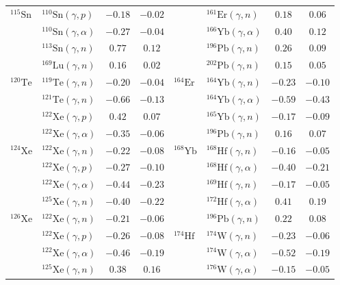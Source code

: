 \begin{table}
\begin{tabular}{llcc|llcc}
    $^{115}\mathrm{Sn}$ & $^{110}\mathrm{Sn}(\gamma,p)$ & $-0.18$ & $-0.02$ & $ $ & $^{161}\mathrm{Er}(\gamma,n)$ & $0.18$ & $0.06$ \\ 
    $ $ & $^{110}\mathrm{Sn}(\gamma,\alpha)$ & $-0.27$ & $-0.04$ & $ $ & $^{166}\mathrm{Yb}(\gamma,\alpha)$ & $0.40$ & $0.12$ \\ 
    $ $ & $^{113}\mathrm{Sn}(\gamma,n)$ & $0.77$ & $0.12$ & $ $ & $^{196}\mathrm{Pb}(\gamma,n)$ & $0.26$ & $0.09$ \\ 
    $ $ & $^{169}\mathrm{Lu}(\gamma,n)$ & $0.16$ & $0.02$ & $ $ & $^{202}\mathrm{Pb}(\gamma,n)$ & $0.15$ & $0.05$ \\ 
    $^{120}\mathrm{Te}$ & $^{119}\mathrm{Te}(\gamma,n)$ & $-0.20$ & $-0.04$ & $^{164}\mathrm{Er}$ & $^{164}\mathrm{Yb}(\gamma,n)$ & $-0.23$ & $-0.10$ \\ 
    $ $ & $^{121}\mathrm{Te}(\gamma,n)$ & $-0.66$ & $-0.13$ & $ $ & $^{164}\mathrm{Yb}(\gamma,\alpha)$ & $-0.59$ & $-0.43$ \\ 
    $ $ & $^{122}\mathrm{Xe}(\gamma,p)$ & $0.42$ & $0.07$ & $ $ & $^{165}\mathrm{Yb}(\gamma,n)$ & $-0.17$ & $-0.09$ \\ 
    $ $ & $^{122}\mathrm{Xe}(\gamma,\alpha)$ & $-0.35$ & $-0.06$ & $ $ & $^{196}\mathrm{Pb}(\gamma,n)$ & $0.16$ & $0.07$ \\ 
    $^{124}\mathrm{Xe}$ & $^{122}\mathrm{Xe}(\gamma,n)$ & $-0.22$ & $-0.08$ & $^{168}\mathrm{Yb}$ & $^{168}\mathrm{Hf}(\gamma,n)$ & $-0.16$ & $-0.05$ \\ 
    $ $ & $^{122}\mathrm{Xe}(\gamma,p)$ & $-0.27$ & $-0.10$ & $ $ & $^{168}\mathrm{Hf}(\gamma,\alpha)$ & $-0.40$ & $-0.21$ \\ 
    $ $ & $^{122}\mathrm{Xe}(\gamma,\alpha)$ & $-0.44$ & $-0.23$ & $ $ & $^{169}\mathrm{Hf}(\gamma,n)$ & $-0.17$ & $-0.05$ \\ 
    $ $ & $^{125}\mathrm{Xe}(\gamma,n)$ & $-0.40$ & $-0.22$ & $ $ & $^{172}\mathrm{Hf}(\gamma,\alpha)$ & $0.41$ & $0.19$ \\ 
    $^{126}\mathrm{Xe}$ & $^{122}\mathrm{Xe}(\gamma,n)$ & $-0.21$ & $-0.06$ & $ $ & $^{196}\mathrm{Pb}(\gamma,n)$ & $0.22$ & $0.08$ \\ 
    $ $ & $^{122}\mathrm{Xe}(\gamma,p)$ & $-0.26$ & $-0.08$ & $^{174}\mathrm{Hf}$ & $^{174}\mathrm{W}(\gamma,n)$ & $-0.23$ & $-0.06$ \\ 
    $ $ & $^{122}\mathrm{Xe}(\gamma,\alpha)$ & $-0.46$ & $-0.19$ & $ $ & $^{174}\mathrm{W}(\gamma,\alpha)$ & $-0.52$ & $-0.19$ \\ 
    $ $ & $^{125}\mathrm{Xe}(\gamma,n)$ & $0.38$ & $0.16$ & $ $ & $^{176}\mathrm{W}(\gamma,\alpha)$ & $-0.15$ & $-0.05$ \\ 

\end{tabular}
\end{table}
